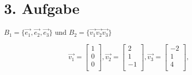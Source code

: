 \documentclass{report}
\begin{document}
\section*{3. Aufgabe}
$B_1=\{\vec{e_1},\vec{e_2},\vec{e_3}\}$ und $B_2=\{\vec{v_1}\vec{v_2}\vec{v_3}\}$

$$
\vec{v_1}= \begin{bmatrix}
    1 \\
    0 \\
    0 \\
    \end{bmatrix}, \vec{v_2}= \begin{bmatrix}
    2 \\
    1 \\
    -1 \\
    \end{bmatrix}, \vec{v_3}= \begin{bmatrix}
    -2 \\
    1 \\
    4 \\
\end{bmatrix}, 
$$ 
\end{document}
